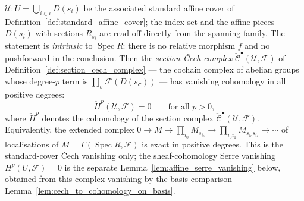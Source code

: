 \begin{lemma}
  \(\mathcal{U} : U = \bigcup_{i \in \iota} D(s_i)\) be the associated standard
  affine cover of Definition~\ref{def:standard_affine_cover}; the index set and the
  affine pieces \(D(s_i)\) with sections \(R_{s_i}\) are read off directly from the
  spanning family. The statement is \emph{intrinsic} to \(\operatorname{Spec} R\):
  there is no relative morphism \(f\) and no pushforward in the conclusion. Then the
  \emph{section {\v C}ech complex} \(\check{\mathcal{C}}^\bullet(\mathcal{U},
  \mathcal{F})\) of Definition~\ref{def:section_cech_complex} --- the cochain
  complex of abelian groups whose degree-\(p\) term is
  \(\prod_{\sigma}\mathcal{F}(D(s_\sigma))\) --- has vanishing cohomology in all
  positive degrees:
  \[
    \check{H}^p(\mathcal{U}, \mathcal{F}) = 0 \qquad \text{for all } p > 0,
  \]
  where \(\check{H}^p\) denotes the cohomology of the section complex
  \(\check{\mathcal{C}}^\bullet(\mathcal{U}, \mathcal{F})\). Equivalently, the
  extended complex
  \(0 \to M \to \prod_{i_0} M_{s_{i_0}} \to \prod_{i_0 i_1} M_{s_{i_0} s_{i_1}}
  \to \cdots\) of localisations of \(M = \Gamma(\operatorname{Spec} R, \mathcal{F})\)
  is exact in positive degrees. This is the standard-cover {\v C}ech vanishing
  only; the sheaf-cohomology Serre vanishing \(H^p(U, \mathcal{F}) = 0\) is the
  separate Lemma~\ref{lem:affine_serre_vanishing} below, obtained from this complex
  vanishing by the basis-comparison Lemma~\ref{lem:cech_to_cohomology_on_basis}.
\end{lemma}

